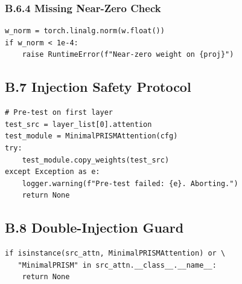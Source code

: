 \subsubsection{B.6.4 Missing Near-Zero Check}

\begin{lstlisting}
w_norm = torch.linalg.norm(w.float())
if w_norm < 1e-4:
    raise RuntimeError(f"Near-zero weight on {proj}")
\end{lstlisting}

\subsection{B.7 Injection Safety Protocol}

\begin{lstlisting}
# Pre-test on first layer
test_src = layer_list[0].attention
test_module = MinimalPRISMAttention(cfg)
try:
    test_module.copy_weights(test_src)
except Exception as e:
    logger.warning(f"Pre-test failed: {e}. Aborting.")
    return None
\end{lstlisting}

\subsection{B.8 Double-Injection Guard}

\begin{lstlisting}
if isinstance(src_attn, MinimalPRISMAttention) or \
   "MinimalPRISM" in src_attn.__class__.__name__:
    return None
\end{lstlisting}

